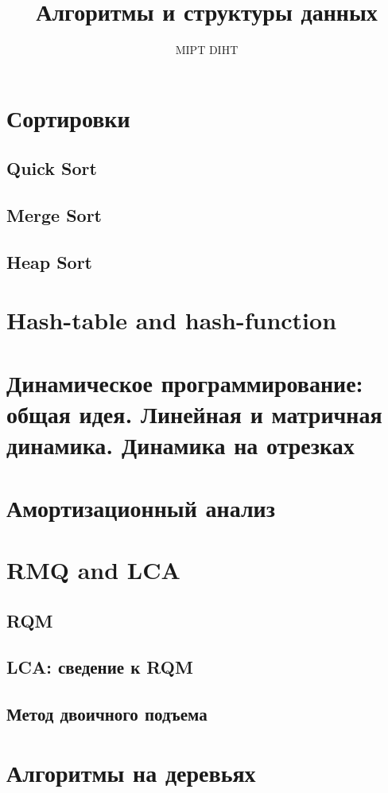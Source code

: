 \documentclass[a4paper]{article}
\title{Алгоритмы и структуры данных}
\author{MIPT DIHT}
\begin{document}
\maketitle

\section{Сортировки}
\subsection{Quick Sort}
\subsection{Merge Sort}
\subsection{Heap Sort}

\section{Hash-table and hash-function}

\section{Динамическое программирование: общая идея. Линейная и матричная динамика. Динамика на отрезках}

\section{Амортизационный анализ}

\section{RMQ and LCA}
\subsection{RQM}
\subsection{LCA: сведение к RQM}
\subsection{Метод двоичного подъема}

\section{Алгоритмы на деревьях}
\end{document}

